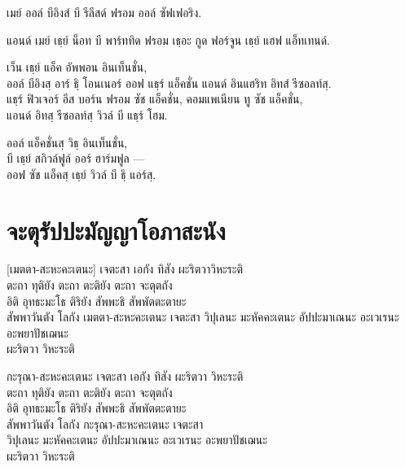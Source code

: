 \begin{english}
เมย์ ออล์ บีอิงส์ บี รีลีสด์ ฟรอม ออล์ ซัฟเฟอริง.

\begin{english}
แอนด์ เมย์ เธฺย์ น็อท บี พาร์ททิด ฟรอม เธฺอะ กูด ฟอร์จูน เธฺย์ แฮฟ แอ็ทเทนด์.
\end{english}

\begin{english}
เว็น เธฺย์ แอ็ค อัพพอน อินเท็นชั่น,\\
ออล์ บีอิงสฺ อาร์ ธฺิ โอนเนอร์ ออฟ แธฺร์ แอ็คชั่น แอนด์ อินแฮริท อิทส์ รีซอลท์สฺ.\\
แธฺร์ ฟิวเจอร์ อีส บอร์น ฟรอม ซัช แอ็คชั่น, คอมแพเนียน ทู ซัช แอ็คชั่น,\\
แอนด์ อิทสฺ รีซอลท์สฺ วิวล์ บี แธฺร์ โฮม.
\end{english}

\begin{english}
ออล์ แอ็คชั่นสฺ วิธฺ อินเท็นชั่น,\\
บี เธฺย์ สกิวล์ฟูล์ ออร์ ฮาร์มฟูล —\\
ออฟ ซัช แอ็คสฺ เธฺย์ วิวล์ บี ธฺิ แอร์สฺ.
\end{english}

\chapter{จะตุรัปปะมัญญาโอภาสะนัง}


\begin{leader}
\end{leader}

[เมตตา-สะหะคะเตนะ] เจตะสา เอกัง ทิสัง ผะริตวาวิหะระติ\\
ตะถา ทุติยัง ตะถา ตะติยัง ตะถา จะตุตถัง\\
อิติ อุทธะมะโธ ติริยัง สัพพะธิ สัพพัตตะตายะ\\
สัพพาวันตัง โลกัง เมตตา-สะหะคะเตนะ เจตะสา
วิปุเลนะ มะหัคคะเตนะ อัปปะมาเณนะ อะเวเรนะ อะพยาปัชเฌนะ\\
\vin ผะริตวา วิหะระติ

กะรุณา-สะหะคะเตนะ เจตะสา เอกัง ทิสัง ผะริตวา วิหะระติ\\
ตะถา ทุติยัง ตะถา ตะติยัง ตะถา จะตุตถัง\\
อิติ อุทธะมะโธ ติริยัง สัพพะธิ สัพพัตตะตายะ\\
สัพพาวันตัง โลกัง กะรุณา-สะหะคะเตนะ เจตะสา\\
วิปุเลนะ มะหัคคะเตนะ อัปปะมาเณนะ อะเวเรนะ อะพยาปัชเฌนะ\\
\vin ผะริตวา วิหะระติ


\end{english}
